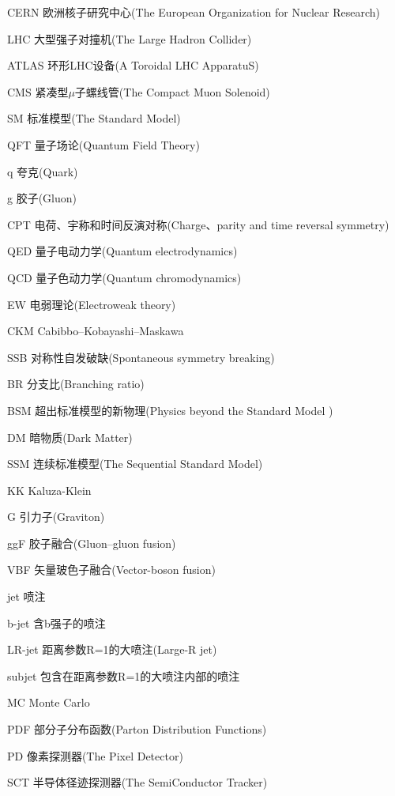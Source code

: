 
\begin{denotation}[3cm]
\item[CERN] 欧洲核子研究中心(The European Organization for Nuclear Research)
\item[LHC] 大型强子对撞机(The Large Hadron Collider)
\item[ATLAS] 环形LHC设备(A Toroidal LHC ApparatuS)
\item[CMS] 紧凑型$\mu$子螺线管(The Compact Muon Solenoid)
\item[SM] 标准模型(The Standard Model)
\item[QFT] 量子场论(Quantum Field Theory)
\item[q] 夸克(Quark)
\item[g] 胶子(Gluon)
\item[CPT] 电荷、宇称和时间反演对称(Charge、parity and time reversal symmetry)
\item [QED] 量子电动力学(Quantum electrodynamics)
\item[QCD] 量子色动力学(Quantum chromodynamics)
\item[EW] 电弱理论(Electroweak theory)
\item[CKM] Cabibbo–Kobayashi–Maskawa
\item[SSB] 对称性自发破缺(Spontaneous symmetry breaking)
\item[BR] 分支比(Branching ratio)
\item[BSM] 超出标准模型的新物理(Physics beyond the Standard Model )
\item[DM] 暗物质(Dark Matter)
\item[SSM] 连续标准模型(The Sequential Standard Model)
\item[KK] Kaluza-Klein
\item[G] 引力子(Graviton)
\item[ggF] 胶子融合(Gluon–gluon fusion)
\item[VBF] 矢量玻色子融合(Vector-boson fusion)
\item[jet] 喷注
\item[b-jet] 含b强子的喷注
\item[LR-jet] 距离参数R=1的大喷注(Large-R jet)
\item[subjet] 包含在距离参数R=1的大喷注内部的喷注
\item[MC] Monte Carlo
\item[PDF] 部分子分布函数(Parton Distribution Functions)
\item[PD] 像素探测器(The Pixel Detector)
\item[SCT] 半导体径迹探测器(The SemiConductor Tracker)

\end{denotation}
